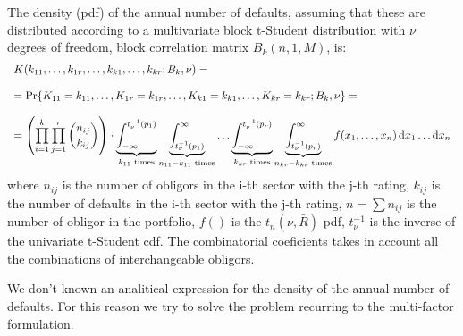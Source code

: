 \documentclass[11pt,fleqn]{book} %
\begin{document}
\begin{proposition}
	The density (pdf) of the annual number of defaults, assuming that these
	are distributed according to a multivariate block t-Student distribution
	with $\nu$ degrees of freedom, block correlation matrix $B_k(n,1,M)$, is:
	\begin{displaymath}
		\begin{array}{l}
			K(k_{11},\dots,k_{1r},\dots,k_{k1},\dots,k_{kr}; B_k,\nu) =                                   \\
			                                                                                              \\
			= \Pr\{K_{11}=k_{11},\dots,K_{1r}=k_{1r},\dots,K_{k1}=k_{k1},\dots,K_{kr}=k_{kr}; B_k,\nu\} = \\
			                                                                                              \\
			= \left( \displaystyle \prod_{i=1}^k \prod_{j=1}^r \binom{n_{ij}}{k_{ij}} \right) \cdot       
			\displaystyle                                                                                 
			\underbrace{\int_{-\infty}^{t_{\nu}^{-1}(p_1)}}_{k_{11} \text{ times}}                        
			\underbrace{\int_{t_{\nu}^{-1}(p_1)}^{\infty}}_{n_{11}-k_{11} \text{ times}}                  
			\dots                                                                                         
			\underbrace{\int_{-\infty}^{t_{\nu}^{-1}(p_r)}}_{k_{kr} \text{ times}}                        
			\underbrace{\int_{t_{\nu}^{-1}(p_r)}^{\infty}}_{n_{kr}-k_{kr} \text{ times}}                  
			f(x_1,\dots,x_n) \mathop{\mathrm{{}d}}\mathopen{} x_1 \dots \mathop{\mathrm{{}d}}\mathopen{} x_n                                                        
		\end{array}
	\end{displaymath}
	where $n_{ij}$ is the number of obligors in the i-th sector with the 
	j-th rating, $k_{ij}$ is the number of defaults in the i-th sector 
	with the j-th rating, $n = \sum n_{ij}$ is the number of obligor in the
	portfolio, $f()$ is the $t_n(\nu,\bar{R})$ pdf, $t_{\nu}^{-1}$ is the
	inverse of the univariate t-Student cdf. The combinatorial coeficients
	takes in account all the combinations of interchangeable obligors.
\end{proposition}

We don't known an analitical expression for the density of the annual 
number of defaults. For this reason we try to solve the problem recurring 
to the multi-factor formulation.
\end{document}
